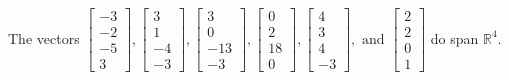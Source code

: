 \begin{exercise}
\begin{exerciseStatement}
  \end{exerciseStatement}
  \begin{exerciseAnswer}
   The vectors \(\left[\begin{array}{r}
-3 \\
-2 \\
-5 \\
3
\end{array}\right] , \left[\begin{array}{r}
3 \\
1 \\
-4 \\
-3
\end{array}\right] , \left[\begin{array}{r}
3 \\
0 \\
-13 \\
-3
\end{array}\right] , \left[\begin{array}{r}
0 \\
2 \\
18 \\
0
\end{array}\right] , \left[\begin{array}{r}
4 \\
3 \\
4 \\
-3
\end{array}\right] , \text{ and } \left[\begin{array}{r}
2 \\
2 \\
0 \\
1
\end{array}\right]\) 
  	 do  
	span \(\mathbb{R}^4\).
  


  \end{exerciseAnswer}
\end{exercise}
